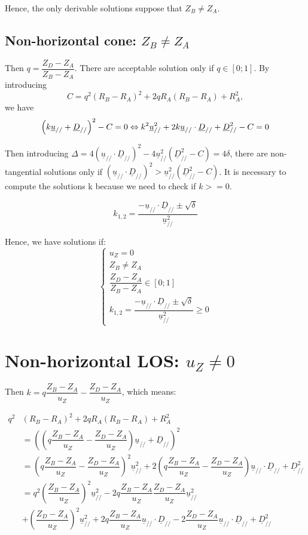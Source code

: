 \documentclass[a4paper,11pt,twoside,titlepage,openright]{book}
\numberwithin{equation}{section}
\newcommand{\ud}[1]{\underline{#1}}
\begin{document}
Hence, the only derivable solutions suppose that $Z_B\neq Z_A$.

\subsection{Non-horizontal cone: $Z_B\neq Z_A$}

Then $q=\dfrac{Z_D-Z_A}{Z_B-Z_A}$.
There are acceptable solution only if $q\in[0;1]$.
By introducing $$C = q^2(R_B-R_A)^2 + 2qR_A(R_B-R_A) + R_A^2,$$ we have
$$
\left(k\ud{u}_{//} + \ud{D}_{//}\right)^2 - C = 0\\
\Leftrightarrow k^2\ud{u}_{//}^2 + 2k\ud{u}_{//}\cdot\ud{D}_{//} + \ud{D}_{//}^2-C = 0
$$

Then introducing $\Delta = 4\left(\ud{u}_{//}\cdot\ud{D}_{//}\right)^2 - 4\ud{u}_{//}^2\left(\ud{D}_{//}^2-C\right) = 4\delta$, there are non-tangential solutions only if $\left(\ud{u}_{//}\cdot\ud{D}_{//}\right)^2 >\ud{u}_{//}^2\left(\ud{D}_{//}^2-C\right)$.
It is necessary to compute the solutions k because we need to check if $k>=0$.

$$
k_{1,2} = \dfrac{-\ud{u}_{//}\cdot\ud{D}_{//} \pm \sqrt{\delta}}{\ud{u}_{//}^2}
$$

Hence, we have solutions if:
$$
\left\{
\begin{array}{lll}
u_Z = 0\\
Z_B\neq Z_A\\
\dfrac{Z_D-Z_A}{Z_B-Z_A} \in [0;1]\\
k_{1,2} = \dfrac{-\ud{u}_{//}\cdot\ud{D}_{//} \pm \sqrt{\delta}}{\ud{u}_{//}^2} \geq 0
\end{array}
\right.
$$

\section{Non-horizontal LOS: $u_Z\neq0$}

Then $k=q\dfrac{Z_B-Z_A}{u_Z} - \dfrac{Z_D-Z_A}{u_Z}$, which means:


$$
\begin{array}{lll}
q^2 & (R_B-R_A)^2 + 2qR_A(R_B-R_A) + R_A^2\\
& =\left(\left(q\dfrac{Z_B-Z_A}{u_Z} - \dfrac{Z_D-Z_A}{u_Z}\right)\ud{u}_{//} + \ud{D}_{//}\right)^2\\
& = \left(q\dfrac{Z_B-Z_A}{u_Z} - \dfrac{Z_D-Z_A}{u_Z}\right)^2\ud{u}_{//}^2 + 2\left(q\dfrac{Z_B-Z_A}{u_Z} - \dfrac{Z_D-Z_A}{u_Z}\right)\ud{u}_{//}\cdot\ud{D}_{//} + \ud{D}_{//}^2\\
& =q^2\left(\dfrac{Z_B-Z_A}{u_Z}\right)^2\ud{u}_{//}^2 - 2q\dfrac{Z_B-Z_A}{u_Z}\dfrac{Z_D-Z_A}{u_Z}\ud{u}_{//}^2 \\
& + \left(\dfrac{Z_D-Z_A}{u_Z}\right)^2\ud{u}_{//}^2
+ 2q\dfrac{Z_B-Z_A}{u_Z}\ud{u}_{//}\cdot\ud{D}_{//} - 2\dfrac{Z_D-Z_A}{u_Z}\ud{u}_{//}\cdot\ud{D}_{//} + \ud{D}_{//}^2\\
\end{array}
$$
\end{document}
